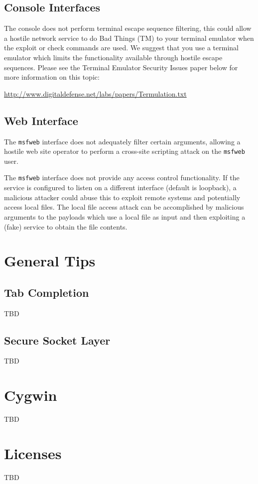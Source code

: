 \documentclass{report}
\begin{document}
	\section{Console Interfaces}
\par
The console does not perform terminal escape sequence filtering, this
could allow a hostile network service to do Bad Things (TM) to your terminal
emulator when the exploit or check commands are used. We suggest that you
use a terminal emulator which limits the functionality available through
hostile escape sequences. Please see the Terminal Emulator Security Issues paper
below for more information on this topic:

\url{http://www.digitaldefense.net/labs/papers/Termulation.txt}


	\section{Web Interface}
\par
The \texttt{msfweb} interface does not adequately filter certain arguments,
allowing a hostile web site operator to perform a cross-site scripting
attack on the \texttt{msfweb} user.

\par
The \texttt{msfweb} interface does not provide any access control functionality. If
the service is configured to listen on a different interface (default is
loopback), a malicious attacker could abuse this to exploit remote systems
and potentially access local files. The local file access attack can be
accomplished by malicious arguments to the payloads which use a local file
as input and then exploiting a (fake) service to obtain the file contents.
	

\pagebreak
\chapter{General Tips}


	\section{Tab Completion}
	\label{REF-TAB}
\par
TBD
	\section{Secure Socket Layer}
	\label{REF-SSL}
\par
TBD

\pagebreak
\chapter{Cygwin}
\label{CYGWIN}	
	
\par
TBD

\pagebreak
\chapter{Licenses}

\par
TBD
\end{document}

